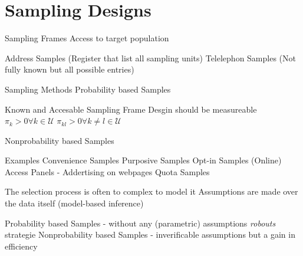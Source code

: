 \documentclass{beamer}\usepackage[]{graphicx}\usepackage[]{color}
\begin{document}
\section{Sampling Designs}

\begin{frame}{Sampling Frames}
Access to target population

Address    Samples (Register that list all sampling units)
Telelephon Samples (Not fully known but all possible entries)



\end{frame}


\begin{frame}{Sampling Methods}
Probability based Samples

Known and Accesable Sampling Frame
Desgin should be measureable
$\pi_{k}>0  \forall k \in \mathcal{U}$
$\pi_{kl}>0 \forall k \neq l \in \mathcal{U}$



Nonprobability based Samples

Examples
Convenience Samples
Purposive   Samples
Opt-in      Samples (Online) Access Panels - Addertising on webpages
Quota       Samples

The selection process is often to complex to model it
Assumptions are made over the data itself (model-based inference)


Probability based Samples - without any (parametric) assumptions \emph{robouts} strategie
Nonprobability based Samples - inverificable assumptions but a gain in efficiency 

\end{frame}
\end{document}
